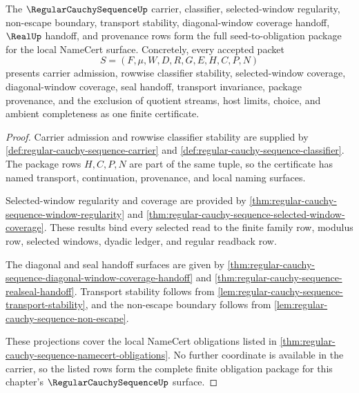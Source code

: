 \begin{theorem}
\label{thm:regular-cauchy-sequence-obligation-closure}
The $\RegularCauchySequenceUp$ carrier, classifier, selected-window regularity, non-escape boundary, transport stability, diagonal-window coverage handoff, $\RealUp$ handoff, and provenance rows form the full seed-to-obligation package for the local NameCert surface. Concretely, every accepted packet
$$
S=(F,\mu,W,D,R,G,E,H,C,P,N)
$$
presents carrier admission, rowwise classifier stability, selected-window coverage, diagonal-window coverage, seal handoff, transport invariance, package provenance, and the exclusion of quotient streams, host limits, choice, and ambient completeness as one finite certificate.
\end{theorem}
\begin{proof}
Carrier admission and rowwise classifier stability are supplied by \autoref{def:regular-cauchy-sequence-carrier} and \autoref{def:regular-cauchy-sequence-classifier}. The package rows $H,C,P,N$ are part of the same tuple, so the certificate has named transport, continuation, provenance, and local naming surfaces.

Selected-window regularity and coverage are provided by \autoref{thm:regular-cauchy-sequence-window-regularity} and \autoref{thm:regular-cauchy-sequence-selected-window-coverage}. These results bind every selected read to the finite family row, modulus row, selected windows, dyadic ledger, and regular readback row.

The diagonal and seal handoff surfaces are given by \autoref{thm:regular-cauchy-sequence-diagonal-window-coverage-handoff} and \autoref{thm:regular-cauchy-sequence-realseal-handoff}. Transport stability follows from \autoref{lem:regular-cauchy-sequence-transport-stability}, and the non-escape boundary follows from \autoref{lem:regular-cauchy-sequence-non-escape}.

These projections cover the local NameCert obligations listed in \autoref{thm:regular-cauchy-sequence-namecert-obligations}. No further coordinate is available in the carrier, so the listed rows form the complete finite obligation package for this chapter's $\RegularCauchySequenceUp$ surface.
\end{proof}

